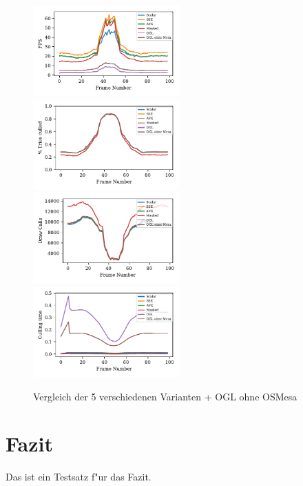 \documentclass[journal]{vgtc}
\begin{document}
\begin{figure}
	\begin{minipage}{0.5\textwidth}
		\includegraphics[width=0.5\textwidth]{images/Evaluation_6_Results_FPS.pdf}
		\includegraphics[width=0.5\textwidth]{images/Evaluation_6_Results_Percentage culled.pdf}
		\includegraphics[width=0.5\textwidth]{images/Evaluation_6_Results_Draw Calls.pdf}
		\includegraphics[width=0.5\textwidth]{images/Evaluation_6_Results_Culling time.pdf}
		\caption{Vergleich der 5 verschiedenen Varianten + OGL ohne OSMesa}
		\label{fig:performance_OSMesa}
	\end{minipage}
\end{figure}





\section{Fazit}
Das ist ein Testsatz f"ur das Fazit.
\end{document}

